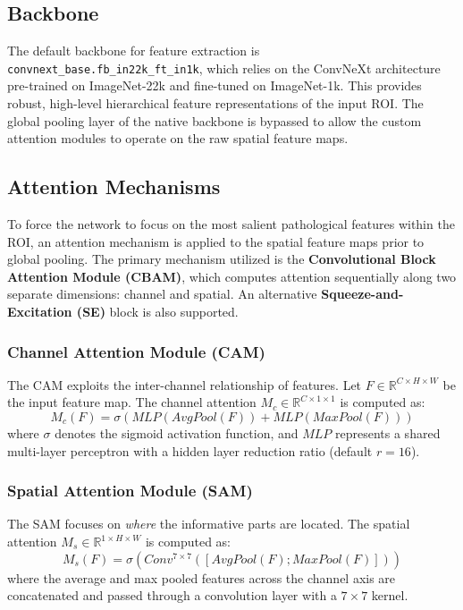\documentclass[11pt,a4paper]{article}
\begin{document}
\subsection{Backbone}
The default backbone for feature extraction is \texttt{convnext\_base.fb\_in22k\_ft\_in1k}, which relies on the ConvNeXt architecture pre-trained on ImageNet-22k and fine-tuned on ImageNet-1k. This provides robust, high-level hierarchical feature representations of the input ROI. The global pooling layer of the native backbone is bypassed to allow the custom attention modules to operate on the raw spatial feature maps.

\subsection{Attention Mechanisms}
To force the network to focus on the most salient pathological features within the ROI, an attention mechanism is applied to the spatial feature maps prior to global pooling. The primary mechanism utilized is the \textbf{Convolutional Block Attention Module (CBAM)}, which computes attention sequentially along two separate dimensions: channel and spatial. An alternative \textbf{Squeeze-and-Excitation (SE)} block is also supported.

\subsubsection{Channel Attention Module (CAM)}
The CAM exploits the inter-channel relationship of features. Let $F \in \mathbb{R}^{C \times H \times W}$ be the input feature map. The channel attention $M_c \in \mathbb{R}^{C \times 1 \times 1}$ is computed as:
\begin{equation}
M_c(F) = \sigma \left( MLP(AvgPool(F)) + MLP(MaxPool(F)) \right)
\end{equation}
where $\sigma$ denotes the sigmoid activation function, and $MLP$ represents a shared multi-layer perceptron with a hidden layer reduction ratio (default $r=16$).

\subsubsection{Spatial Attention Module (SAM)}
The SAM focuses on \textit{where} the informative parts are located. The spatial attention $M_s \in \mathbb{R}^{1 \times H \times W}$ is computed as:
\begin{equation}
M_s(F) = \sigma \left( Conv^{7 \times 7} \left( [AvgPool(F); MaxPool(F)] \right) \right)
\end{equation}
where the average and max pooled features across the channel axis are concatenated and passed through a convolution layer with a $7 \times 7$ kernel.
\end{document}
